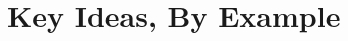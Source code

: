 \documentclass[acmsmall,review,anonymous]{acmart}\settopmatter{printfolios=true,printccs=false,printacmref=false}
\newcommand*{\rsp}{\textsc{sp}}
\begin{document}

%
%
%
%
%
%
%
%
%

\section{Key Ideas, By Example}
\label{sec:running-example}
\end{document}
